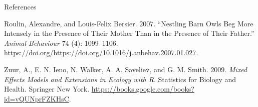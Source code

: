 \documentclass[
  ignorenonframetext,
]{beamer}
\begin{document}
\begin{frame}{References}
\protect\hypertarget{references}{}

\hypertarget{refs}{}
\leavevmode\hypertarget{ref-owls}{}%
Roulin, Alexandre, and Louis-Felix Bersier. 2007. ``Nestling Barn Owls
Beg More Intensely in the Presence of Their Mother Than in the Presence
of Their Father.'' \emph{Animal Behaviour} 74 (4): 1099--1106.
\url{https://doi.org/https://doi.org/10.1016/j.anbehav.2007.01.027}.

\leavevmode\hypertarget{ref-zuur2009mixed}{}%
Zuur, A., E. N. Ieno, N. Walker, A. A. Saveliev, and G. M. Smith. 2009.
\emph{Mixed Effects Models and Extensions in Ecology with R}. Statistics
for Biology and Health. Springer New York.
\url{https://books.google.com/books?id=vQUNprFZKHsC}.

\end{frame}
\end{document}
